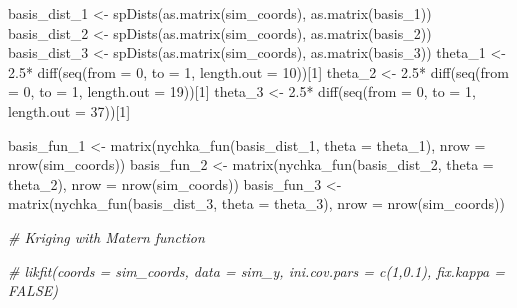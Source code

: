 \documentclass[
]{article}
\newenvironment{Shaded}{\begin{snugshade}}{\end{snugshade}}
\newcommand{\AttributeTok}[1]{\textcolor[rgb]{0.77,0.63,0.00}{#1}}
\newcommand{\CommentTok}[1]{\textcolor[rgb]{0.56,0.35,0.01}{\textit{#1}}}
\newcommand{\DecValTok}[1]{\textcolor[rgb]{0.00,0.00,0.81}{#1}}
\newcommand{\FloatTok}[1]{\textcolor[rgb]{0.00,0.00,0.81}{#1}}
\newcommand{\FunctionTok}[1]{\textcolor[rgb]{0.00,0.00,0.00}{#1}}
\newcommand{\NormalTok}[1]{#1}
\newcommand{\OtherTok}[1]{\textcolor[rgb]{0.56,0.35,0.01}{#1}}
\newcommand{\SpecialCharTok}[1]{\textcolor[rgb]{0.00,0.00,0.00}{#1}}
\begin{document}
\begin{Shaded}
\begin{Highlighting}[]
\NormalTok{  basis\_dist\_1 }\OtherTok{\textless{}{-}} \FunctionTok{spDists}\NormalTok{(}\FunctionTok{as.matrix}\NormalTok{(sim\_coords), }\FunctionTok{as.matrix}\NormalTok{(basis\_1))}
\NormalTok{  basis\_dist\_2 }\OtherTok{\textless{}{-}} \FunctionTok{spDists}\NormalTok{(}\FunctionTok{as.matrix}\NormalTok{(sim\_coords), }\FunctionTok{as.matrix}\NormalTok{(basis\_2))}
\NormalTok{  basis\_dist\_3 }\OtherTok{\textless{}{-}} \FunctionTok{spDists}\NormalTok{(}\FunctionTok{as.matrix}\NormalTok{(sim\_coords), }\FunctionTok{as.matrix}\NormalTok{(basis\_3))}
\NormalTok{  theta\_1 }\OtherTok{\textless{}{-}} \FloatTok{2.5}\SpecialCharTok{*} \FunctionTok{diff}\NormalTok{(}\FunctionTok{seq}\NormalTok{(}\AttributeTok{from =} \DecValTok{0}\NormalTok{, }\AttributeTok{to =} \DecValTok{1}\NormalTok{, }\AttributeTok{length.out =} \DecValTok{10}\NormalTok{))[}\DecValTok{1}\NormalTok{]}
\NormalTok{  theta\_2 }\OtherTok{\textless{}{-}} \FloatTok{2.5}\SpecialCharTok{*} \FunctionTok{diff}\NormalTok{(}\FunctionTok{seq}\NormalTok{(}\AttributeTok{from =} \DecValTok{0}\NormalTok{, }\AttributeTok{to =} \DecValTok{1}\NormalTok{, }\AttributeTok{length.out =} \DecValTok{19}\NormalTok{))[}\DecValTok{1}\NormalTok{]}
\NormalTok{  theta\_3 }\OtherTok{\textless{}{-}} \FloatTok{2.5}\SpecialCharTok{*} \FunctionTok{diff}\NormalTok{(}\FunctionTok{seq}\NormalTok{(}\AttributeTok{from =} \DecValTok{0}\NormalTok{, }\AttributeTok{to =} \DecValTok{1}\NormalTok{, }\AttributeTok{length.out =} \DecValTok{37}\NormalTok{))[}\DecValTok{1}\NormalTok{]}
  
\NormalTok{  basis\_fun\_1 }\OtherTok{\textless{}{-}} \FunctionTok{matrix}\NormalTok{(}\FunctionTok{nychka\_fun}\NormalTok{(basis\_dist\_1, }\AttributeTok{theta =}\NormalTok{ theta\_1), }\AttributeTok{nrow =} \FunctionTok{nrow}\NormalTok{(sim\_coords))}
\NormalTok{  basis\_fun\_2 }\OtherTok{\textless{}{-}} \FunctionTok{matrix}\NormalTok{(}\FunctionTok{nychka\_fun}\NormalTok{(basis\_dist\_2, }\AttributeTok{theta =}\NormalTok{ theta\_2), }\AttributeTok{nrow =} \FunctionTok{nrow}\NormalTok{(sim\_coords))}
\NormalTok{  basis\_fun\_3 }\OtherTok{\textless{}{-}} \FunctionTok{matrix}\NormalTok{(}\FunctionTok{nychka\_fun}\NormalTok{(basis\_dist\_3, }\AttributeTok{theta =}\NormalTok{ theta\_3), }\AttributeTok{nrow =} \FunctionTok{nrow}\NormalTok{(sim\_coords))}
\end{Highlighting}
\end{Shaded}

\begin{Shaded}
\begin{Highlighting}[]
\CommentTok{\# Kriging with Matern function}

\CommentTok{\# likfit(coords = sim\_coords, data = sim\_y, ini.cov.pars = c(1,0.1), fix.kappa = FALSE)}
\end{Highlighting}
\end{Shaded}
\end{document}
